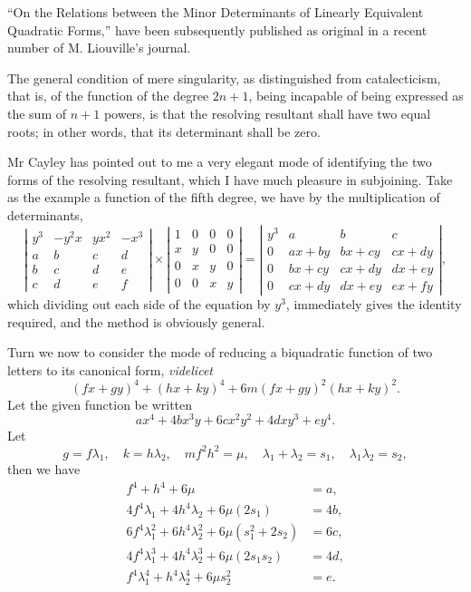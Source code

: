 \documentclass[11pt]{article}
\newcommand{\sourcepage}[1]{\marginpar{\scriptsize p.~#1}}
\begin{document}
{{\sourcepage{269}
``On the Relations between the Minor Determinants of Linearly Equivalent Quadratic Forms,'' have been subsequently published as original in a recent number of M. Liouville's journal.

The general condition of mere singularity, as distinguished from catalecticism, that is, of the function of the degree $2n+1$, being incapable of being expressed as the sum of $n+1$ powers, is that the resolving resultant shall have two equal roots; in other words, that its determinant shall be zero.

Mr Cayley has pointed out to me a very elegant mode of identifying the two forms of the resolving resultant, which I have much pleasure in subjoining. Take as the example a function of the fifth degree, we have by the multiplication of determinants,
\[
\left|\begin{array}{rrrr}
y^3&-y^2x&yx^2&-x^3\\
a&b&c&d\\
b&c&d&e\\
c&d&e&f
\end{array}\right|
\times
\left|\begin{array}{rrrr}
1&0&0&0\\
x&y&0&0\\
0&x&y&0\\
0&0&x&y
\end{array}\right|
=
\left|\begin{array}{rrrr}
y^3&a&b&c\\
0&ax+by&bx+cy&cx+dy\\
0&bx+cy&cx+dy&dx+ey\\
0&cx+dy&dx+ey&ex+fy
\end{array}\right|,
\]
which dividing out each side of the equation by $y^3$, immediately gives the identity required, and the method is obviously general.

Turn we now to consider the mode of reducing a biquadratic function of two letters to its canonical form, \emph{videlicet}
\[
(fx+gy)^4+(hx+ky)^4+6m(fx+gy)^2(hx+ky)^2.
\]
Let the given function be written
\[
ax^4+4bx^3y+6cx^2y^2+4dxy^3+ey^4.
\]
Let
\[
g=f\lambda_1,\quad k=h\lambda_2,\quad mf^2h^2=\mu,\quad
\lambda_1+\lambda_2=s_1,\quad \lambda_1\lambda_2=s_2,
\]
then we have
\[
\begin{aligned}
f^4+h^4+6\mu&=a,\\
4f^4\lambda_1+4h^4\lambda_2+6\mu(2s_1)&=4b,\\
6f^4\lambda_1^2+6h^4\lambda_2^2+6\mu(s_1^2+2s_2)&=6c,\\
4f^4\lambda_1^3+4h^4\lambda_2^3+6\mu(2s_1s_2)&=4d,\\
f^4\lambda_1^4+h^4\lambda_2^4+6\mu s_2^2&=e.
\end{aligned}
\]

}}
\end{document}
